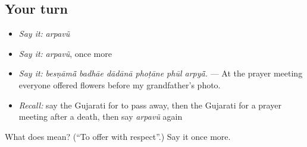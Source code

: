 \subsection*{Your turn}
\begin{itemize}
\raggedright
  \item \emph{Say it:} \emph{arpavũ}
  \item \emph{Say it:} \emph{arpavũ}, once more
  \item \emph{Say it:} \emph{besṇāmā̃ badhāe dādānā phoṭāne phūl arpyā̃.} — At the prayer meeting everyone offered flowers before my grandfather's photo.
  \item \emph{Recall:} say the Gujarati for to pass away, then the Gujarati for a prayer meeting after a death, then say \emph{arpavũ} again
\end{itemize}

\begin{tcolorbox}[breakable,colback=teal!4,colframe=teal!35!black,title={Before you move on}]
What does  mean? (\textquotedblleft{}To offer with respect\textquotedblright{}.) Say it once more.
\end{tcolorbox}
